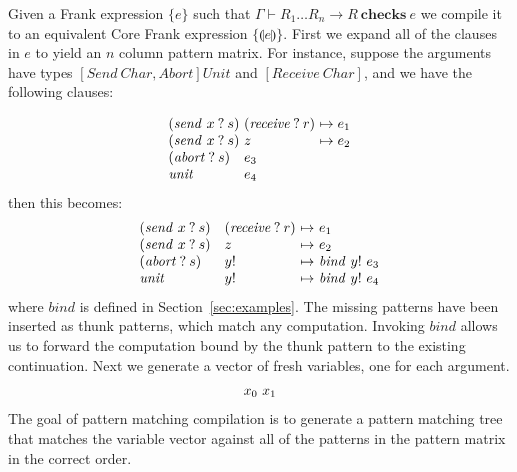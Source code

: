 \documentclass[preprint]{sigplanconf}
\newcommand{\pc}[1]{\llparenthesis{#1}\rrparenthesis}
\newcommand\ba{\begin{array}}
\newcommand\ea{\end{array}}
\newcommand{\judgeword}[1]{~\mathbf{#1}~}
\newcommand{\does}[3]{#1 \vdash {#2} \judgeword{checks} {#3}}
\newcommand{\doesg}{\does{\Gamma}}
\newcommand{\effbox}[1]{[#1]}
\newcommand{\var}{\mathit}
\newcommand{\handleSymbol}{\mathbin{?}}
\newcommand{\handle}[2]{{#1} \handleSymbol {#2}}
\newcommand{\thunk}[1]{\{{#1}\}}
\newcommand{\force}[1]{{#1}!}
\begin{document}
\begin{sloppypar}
Given a Frank expression $\thunk{e}$ such that $\doesg{R_1 \dots R_n
  \to R}{e}$
%
we compile it to an equivalent Core Frank expression $\thunk{\pc{e}}$.
%
First we expand all of the clauses in $e$ to yield an $n$ column
pattern matrix. For instance, suppose the arguments have types
$\effbox{\var{Send~Char}, \var{Abort}}\var{Unit}$ and
$\effbox{\var{Receive~Char}}$, and we have the following clauses:
\end{sloppypar}
\[
\ba{@{}l@{~}l@{~}l@{}}
  (\handle{\var{send}~x}{s}) & (\handle{\var{receive}}{r}) & \mapsto e_1 \\
  (\handle{\var{send}~x}{s}) & z & \mapsto e_2 \\
  (\handle{\var{abort}}{s})  & e_3 \\
  \var{unit} & e_4 \\
\ea
\]
%
then this becomes:
%
\[
\ba{@{}l@{\quad}l@{~\mapsto~}l@{}}
  (\handle{\var{send}~x}{s}) & (\handle{\var{receive}}{r}) & e_1 \\
  (\handle{\var{send}~x}{s}) & z                           & e_2 \\
  (\handle{\var{abort}}{s})  & \force{y} & \var{bind}~\force{y}~e_3 \\
  \var{unit}                 & \force{y} & \var{bind}~\force{y}~e_4 \\
\ea
\]
%
where $\var{bind}$ is defined in Section~\ref{sec:examples}. The
missing patterns have been inserted as thunk patterns, which match any
computation. Invoking $\var{bind}$ allows us to forward the
computation bound by the thunk pattern to the existing continuation.
%
Next we generate a vector of fresh variables, one for each argument.
\[
\ba{@{}l@{~}l@{}}
  x_0 & x_1
\ea
\]
The goal of pattern matching compilation is to generate a pattern
matching tree that matches the variable vector against all of the
patterns in the pattern matrix in the correct order.
\end{document}
